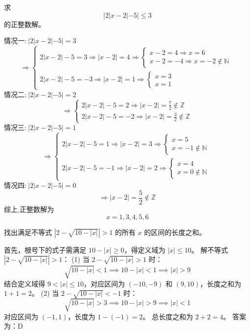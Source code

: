 \begin{questions}
    \question 求 
    \[
    |2|x-2|-5| \le 3
    \]
    的正整数解。
    \begin{solution}
        情况一:$\ |2|x-2|-5| = 3$  
        \[
        \Rightarrow
        \begin{cases}
        2|x-2| - 5 = 3 \Rightarrow |x-2| = 4 \Rightarrow 
        \begin{cases}
        x-2 = 4 \Rightarrow x = 6 \\
        x-2 = -4 \Rightarrow x = -2 \notin \mathbb{N}
        \end{cases} \\
        2|x-2| - 5 = -3 \Rightarrow |x-2| = 1 \Rightarrow 
        \begin{cases}
        x = 3 \\
        x = 1
        \end{cases}
        \end{cases}
        \]
        情况二:$\ |2|x-2|-5| = 2$  
        \[
        \Rightarrow
        \begin{cases}
        2|x-2| - 5 = 2 \Rightarrow |x-2| = \frac{7}{2} \notin \mathbb{Z} \\
        2|x-2| - 5 = -2 \Rightarrow |x-2| = \frac{3}{2} \notin \mathbb{Z}
        \end{cases}
        \]
        情况三:$\ |2|x-2|-5| = 1$  
        \[
        \Rightarrow
        \begin{cases}
        2|x-2| - 5 = 1 \Rightarrow |x-2| = 3 \Rightarrow 
        \begin{cases}
        x = 5 \\
        x = -1 \notin \mathbb{N}
        \end{cases} \\
        2|x-2| - 5 = -1 \Rightarrow |x-2| = 2 \Rightarrow 
        \begin{cases}
        x = 4 \\
        x = 0 \notin \mathbb{N}
        \end{cases}
        \end{cases}
        \]
        情况四:$\ |2|x-2|-5| = 0$  
        \[
        \Rightarrow |x-2| = \frac{5}{2} \notin \mathbb{Z}
        \]
        综上,正整数解为
        \[
        x = 1, 3, 4, 5, 6
        \]
    \end{solution}

    \question 找出满足不等式 $\left| 2 - \sqrt{10 - |x|} \right| > 1$ 的所有 $x$ 的区间的长度之和。

\begin{solution}
首先，根号下的式子需满足 $10 - |x| \ge 0$，得定义域为 $|x| \le 10$。
解不等式 $\left| 2 - \sqrt{10 - |x|} \right| > 1$：
(1) 当 $2 - \sqrt{10 - |x|} > 1$ 时：
\[
\sqrt{10 - |x|} < 1 \implies 10 - |x| < 1 \implies |x| > 9
\]
结合定义域得 $9 < |x| \le 10$，对应区间为 $(-10, -9)$ 和 $(9, 10)$，长度之和为 $1 + 1 = 2$。
(2) 当 $2 - \sqrt{10 - |x|} < -1$ 时：
\[
\sqrt{10 - |x|} > 3 \implies 10 - |x| > 9 \implies |x| < 1
\]
对应区间为 $(-1, 1)$，长度为 $1 - (-1) = 2$。
总长度之和为 $2 + 2 = 4$。
答案为：D
\end{solution}


\end{questions}
